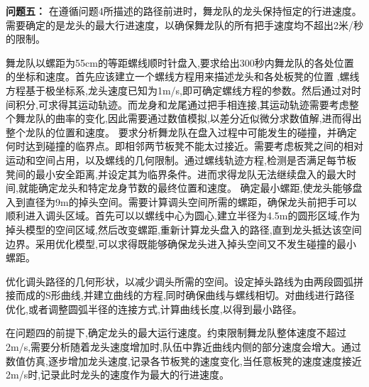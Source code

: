 \textbf {问题五：}
在遵循问题4所描述的路径前进时，舞龙队的龙头保持恒定的行进速度。需要确定的是龙头的最大行进速度，以确保舞龙队的所有把手速度均不超出2米/秒的限制。

\clearpage
{}


舞龙队以螺距为55cm的等距螺线顺时针盘入,要求给出300秒内舞龙队的各处位置的坐标和速度。首先应该建立一个螺线方程用来描述龙头和各处板凳的位置
,螺线方程基于极坐标系,龙头速度已知为1m/s,即可确定螺线方程的参数。然后通过对时间积分,可求得其运动轨迹。而龙身和龙尾通过把手相连接,其运动轨迹需要考虑整个舞龙队的曲率的变化,因此需要通过数值模拟,以差分近似微分求数值解,进而得出整个龙队的位置和速度。
要求分析舞龙队在盘入过程中可能发生的碰撞，并确定何时达到碰撞的临界点。即相邻两节板凳不能太过接近。需要考虑板凳之间的相对运动和空间占用，以及螺线的几何限制。通过螺线轨迹方程,检测是否满足每节板凳间的最小安全距离,并设定其为临界条件。进而求得龙队无法继续盘入的最大时间,就能确定龙头和特定龙身节数的最终位置和速度。
确定最小螺距,使龙头能够盘入到直径为9m的掉头空间。需要计算调头空间所需的螺距，确保龙头前把手可以顺利进入调头区域。首先可以以螺线中心为圆心,建立半径为4.5m的圆形区域,作为掉头模型的空间区域,然后改变螺距,重新计算龙头盘入的路径,直到龙头抵达该空间边界。采用优化模型,可以求得既能够确保龙头进入掉头空间又不发生碰撞的最小螺距。


优化调头路径的几何形状，以减少调头所需的空间。设定掉头路线为由两段圆弧拼接而成的S形曲线,并建立曲线的方程,同时确保曲线与螺线相切。对曲线进行路径优化,或者调整圆弧半径的连接方式,计算曲线长度,以得到最小路径。

在问题四的前提下,确定龙头的最大运行速度。约束限制舞龙队整体速度不超过2m/s,需要分析随着龙头速度增加时,队伍中靠近曲线内侧的部分速度会增大。通过数值仿真,逐步增加龙头速度,记录各节板凳的速度变化,当任意板凳的速度速度接近2m/s时,记录此时龙头的速度作为最大的行进速度。

\clearpage
{}

